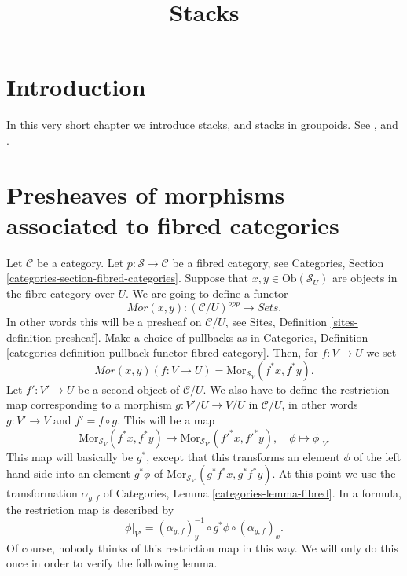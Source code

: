 

%


\title{Stacks}


\maketitle

\label{section-phantom}

\tableofcontents

\section{Introduction}
\label{section-introduction}

\noindent
In this very short chapter we introduce stacks, and
stacks in groupoids. See \cite{DM}, and \cite{Vis2}.


\section{Presheaves of morphisms associated to fibred categories}
\label{section-morphisms}

\noindent
Let $\mathcal{C}$ be a category.
Let $p : \mathcal{S} \to \mathcal{C}$ be a fibred category,
see Categories, Section \ref{categories-section-fibred-categories}.
Suppose that $x, y\in \text{Ob}(\mathcal{S}_U)$ are
objects in the fibre category over $U$. We are going to define
a functor
$$
\mathit{Mor}(x, y) : (\mathcal{C}/U)^{opp} \longrightarrow \textit{Sets}.
$$
In other words this will be a presheaf on $\mathcal{C}/U$, see
Sites, Definition \ref{sites-definition-presheaf}.
Make a choice of pullbacks as in
Categories,
Definition \ref{categories-definition-pullback-functor-fibred-category}.
Then, for $f : V \to U$ we set
$$
\mathit{Mor}(x, y)(f : V \to U) =
\text{Mor}_{\mathcal{S}_V}(f^\ast x, f^\ast y).
$$
Let $f' : V' \to U$ be a second object of $\mathcal{C}/U$.
We also have to define the restriction map corresponding to a
morphism $g : V'/U  \to V/U$ in $\mathcal{C}/U$,
in other words $g : V' \to V$ and $f' = f \circ g$.
This will be a map
$$
\text{Mor}_{\mathcal{S}_V}(f^\ast x, f^\ast y)
\longrightarrow
\text{Mor}_{\mathcal{S}_{V'}}({f'}^\ast x, {f'}^\ast y),\quad
\phi \longmapsto \phi|_{V'}
$$
This map will basically be $g^\ast$, except that this transforms
an element $\phi$ of the left hand side into an element
$g^\ast \phi$
of $\text{Mor}_{\mathcal{S}_{V'}}(g^\ast f^\ast x, g^\ast f^\ast y)$.
At this point we use the transformation $\alpha_{g, f}$ of
Categories, Lemma \ref{categories-lemma-fibred}.
In a formula, the restriction map is described by
$$
\phi|_{V'} =
(\alpha_{g, f})_y^{-1} \circ
g^\ast \phi \circ
(\alpha_{g, f})_x.
$$
Of course, nobody thinks of this restriction map in this way.
We will only do this once in order to verify the following
lemma.

